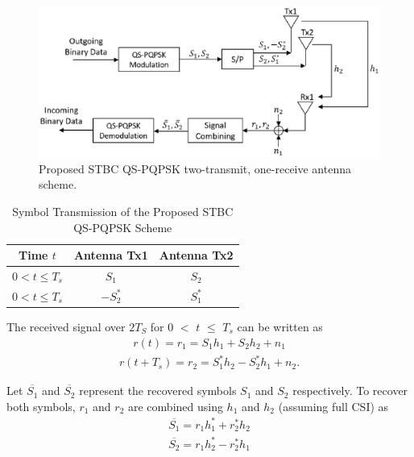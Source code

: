 \begin{figure} [!htpb]
\centering
\vspace{-1.5in}
\includegraphics [width=1\columnwidth]{chap3_fig/chap3_fig5.eps} 
\vspace{-1.5in}
\caption{Proposed STBC QS-PQPSK two-transmit, one-receive antenna scheme.}
\label{fig:chap3_fig5}
\end{figure}

\begin{table}[]
\centering
\caption{Symbol Transmission of the Proposed STBC QS-PQPSK Scheme}
\label{table:chap3_table1}
\begin{tabular}{ccc}
\hline
\textbf{Time $t$} & \textbf{Antenna Tx1} & \textbf{Antenna Tx2} \\ \hline \hline
 $0 < t \leq T_s$& $S_1$ & $S_2$            \\ 
 $0 < t \leq T_s$& $-S_2^{\ast}$ & $S_1^{\ast}$            \\ \hline
\end{tabular}
\end{table}

The received signal over $2T_S$ for $0$ $<$ $t$ ${\leq}$ $T_s$ can be written as
\begin{eqnarray} \label{QSPQPSK_eqn6}
r(t) = r_1 = S_1{h_1} + S_2{h_2} + n_1
\end{eqnarray}
\begin{eqnarray} \label{QSPQPSK_eqn7}
r(t + T_s) = r_2 = S_1^{\ast}{h_2} - S_2^{\ast}{h_1} + n_2.
\end{eqnarray}

Let $\overline{S_1}$ and $\overline{S_2}$ represent the recovered symbols $S_1$ and $S_2$ respectively. To recover both symbols, $r_1$ and $r_2$ are combined using $h_1$ and $h_2$ (assuming full CSI) as
\begin{eqnarray} \label{QSPQPSK_eqn8}
\overline{S_1} = r_1{h_1^{\ast}} + r_2^{\ast}{h_2}
\end{eqnarray}
\begin{eqnarray} \label{QSPQPSK_eqn9}
\overline{S_2} = r_1{h_2^{\ast}} - r_2^{\ast}{h_1}
\end{eqnarray}


